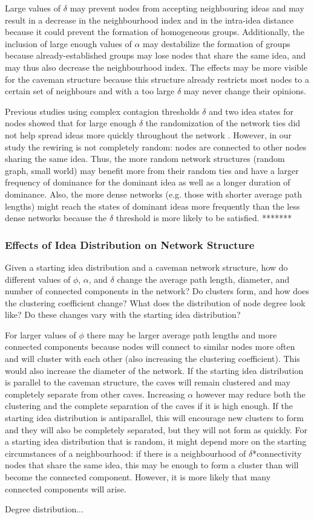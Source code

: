 Large values of $\delta$ may prevent nodes from accepting neighbouring ideas and may result in a decrease in the neighbourhood index and in the intra-idea distance because it could prevent the formation of homogeneous groups. Additionally, the inclusion of large enough values of $\alpha$ may destabilize the formation of groups because already-established groups may lose nodes that share the same idea, and may thus also decrease the neighbourhood index. The effects may be more visible for the caveman structure because this structure already restricts most nodes to a certain set of neighbours and with a too large $\delta$ may never change their opinions.

Previous studies using complex contagion thresholds $\delta$ and two idea states for nodes showed that for large enough $\delta$ the randomization of the network ties did not help spread ideas more quickly throughout the network \citep*{CM2007}. However, in our study the rewiring is not completely random: nodes are connected to other nodes sharing the same idea. Thus, the more random network structures (random graph, small world) may benefit more from their random ties and  have a larger frequency of dominance for the dominant idea as well as a longer duration of dominance. Also, the more dense networks (e.g. those with shorter average path lengths) might reach the states of dominant ideas more frequently than the less dense networks because the $\delta$ threshold is more likely to be satisfied. *******


\subsubsection{Effects of Idea Distribution on Network Structure}

Given a starting idea distribution and a caveman network structure, how do different values of $\phi$, $\alpha$, and $\delta$ change the average path length, diameter, and number of connected components in the network? Do clusters form, and how does the clustering coefficient change? What does the distribution of node degree look like? Do these changes vary with the starting idea distribution?

For larger values of $\phi$ there may be larger average path lengths and more connected components because nodes will connect to similar nodes more often and will cluster with each other (also increasing the clustering coefficient). This would also increase the diameter of the network. If the starting idea distribution is parallel to the caveman structure, the caves will remain clustered and may completely separate from other caves. Increasing $\alpha$ however may reduce both the clustering and the complete separation of the caves if it is high enough. If the starting idea distribution is antiparallel, this will encourage new clusters to form and they will also be completely separated, but they will not form as quickly. For a starting idea distribution that is random, it might depend more on the starting circumstances of a neighbourhood: if there is a neighbourhood of $\delta$*connectivity nodes that share the same idea, this may be enough to form a cluster than will become the connected component. However, it is more likely that many connected components will arise. 

Degree distribution...


